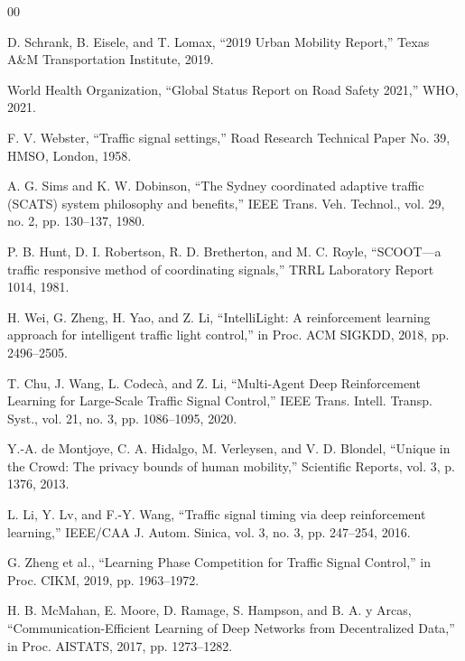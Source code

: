 \documentclass[conference]{IEEEtran}
\begin{document}
\begin{thebibliography}{00}

 D. Schrank, B. Eisele, and T. Lomax, ``2019 Urban Mobility Report,'' Texas A\&M Transportation Institute, 2019.

 World Health Organization, ``Global Status Report on Road Safety 2021,'' WHO, 2021.

 F. V. Webster, ``Traffic signal settings,'' Road Research Technical Paper No. 39, HMSO, London, 1958.

 A. G. Sims and K. W. Dobinson, ``The Sydney coordinated adaptive traffic (SCATS) system philosophy and benefits,'' IEEE Trans. Veh. Technol., vol. 29, no. 2, pp. 130--137, 1980.

 P. B. Hunt, D. I. Robertson, R. D. Bretherton, and M. C. Royle, ``SCOOT---a traffic responsive method of coordinating signals,'' TRRL Laboratory Report 1014, 1981.

 H. Wei, G. Zheng, H. Yao, and Z. Li, ``IntelliLight: A reinforcement learning approach for intelligent traffic light control,'' in Proc. ACM SIGKDD, 2018, pp. 2496--2505.

 T. Chu, J. Wang, L. Codec\`{a}, and Z. Li, ``Multi-Agent Deep Reinforcement Learning for Large-Scale Traffic Signal Control,'' IEEE Trans. Intell. Transp. Syst., vol. 21, no. 3, pp. 1086--1095, 2020.

 Y.-A. de Montjoye, C. A. Hidalgo, M. Verleysen, and V. D. Blondel, ``Unique in the Crowd: The privacy bounds of human mobility,'' Scientific Reports, vol. 3, p. 1376, 2013.

 L. Li, Y. Lv, and F.-Y. Wang, ``Traffic signal timing via deep reinforcement learning,'' IEEE/CAA J. Autom. Sinica, vol. 3, no. 3, pp. 247--254, 2016.

 G. Zheng et al., ``Learning Phase Competition for Traffic Signal Control,'' in Proc. CIKM, 2019, pp. 1963--1972.

 H. B. McMahan, E. Moore, D. Ramage, S. Hampson, and B. A. y Arcas, ``Communication-Efficient Learning of Deep Networks from Decentralized Data,'' in Proc. AISTATS, 2017, pp. 1273--1282.


\end{thebibliography}
\end{document}
